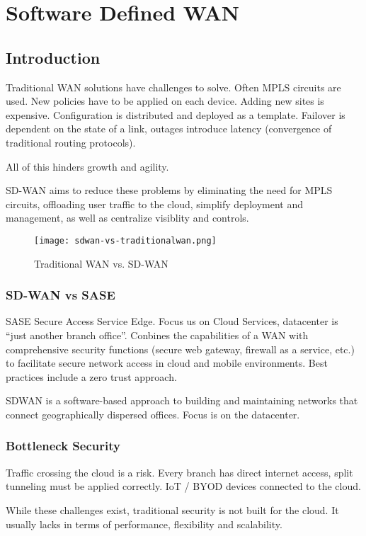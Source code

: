 \section{Software Defined WAN}

\subsection{Introduction}
Traditional WAN solutions have challenges to solve. 
Often MPLS circuits are used. New policies have to be applied on each device. 
Adding new sites is expensive.  
Configuration is distributed and deployed as a template.
Failover is dependent on the state of a link, outages introduce latency (convergence of traditional routing protocols). 

All of this hinders growth and agility.

SD-WAN aims to reduce these problems by eliminating the need for MPLS circuits, offloading user traffic to the cloud, 
simplify deployment and management, as well as centralize visiblity and controls. 

\begin{figure}[h]
    \centering
    \texttt{[image: sdwan-vs-traditionalwan.png]}
    \caption{Traditional WAN vs. SD-WAN}
\end{figure}

\subsubsection{SD-WAN vs SASE}

SASE Secure Access Service Edge. Focus us on Cloud Services, datacenter is ``just another branch office''. Conbines the capabilities of a WAN with comprehensive security functions 
(secure web gateway, firewall as a service, etc.) to facilitate secure network access in cloud and mobile environments. 
Best practices include a zero trust approach. 

SDWAN is a software-based approach to building and maintaining networks that connect geographically dispersed offices. 
Focus is on the datacenter.
\subsubsection{Bottleneck Security}
Traffic crossing the cloud is a risk. Every branch has direct internet access, split tunneling must be applied correctly. 
IoT / BYOD devices connected to the cloud. 

While these challenges exist, traditional security is not built for the cloud. 
It usually lacks in terms of performance, flexibility and scalability.

